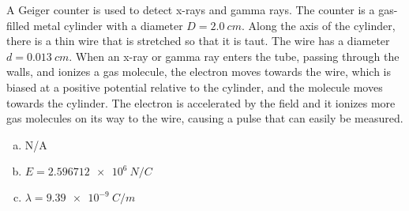 \question A Geiger counter is used to detect x-rays and gamma rays. The counter is a gas-filled metal cylinder with a diameter $D = \SI{2.0}{cm}$. Along the axis of the cylinder, there is a thin wire that is stretched so that it is taut. The wire has a diameter $d = \SI{0.013}{cm}$. When an x-ray or gamma ray enters the tube, passing through the walls, and ionizes a gas molecule, the electron moves towards the wire, which is biased at a positive potential relative to the cylinder, and the molecule moves towards the cylinder. The electron is accelerated by the field and it ionizes more gas molecules on its way to the wire, causing a pulse that can easily be measured. 
\begin{finalanswer}
\begin{enumerate}[(a)]
\item N/A
\item $E=\SI{2.596712e6}{N/C}$
\item $\lambda=\SI{9.39e-9}{C/m}$
\end{enumerate}
\end{finalanswer}
